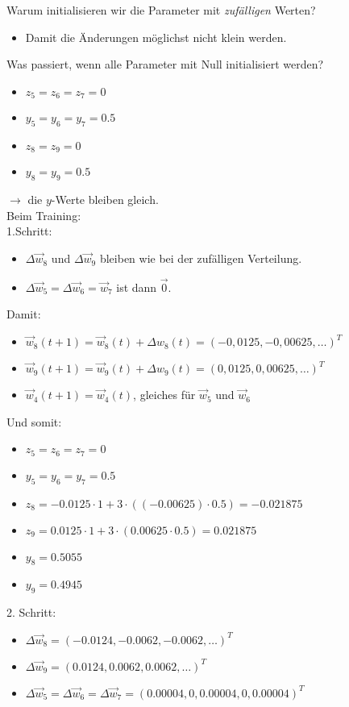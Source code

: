 Warum initialisieren wir die Parameter mit \emph{zufälligen} Werten?
\begin{itemize}
\item Damit die Änderungen möglichst nicht klein werden.
\end{itemize}
Was passiert, wenn alle Parameter mit Null initialisiert werden?
\begin{itemize}
\item $z_5=z_6=z_7=0$
\item $y_5=y_6=y_7=0.5$
\item $z_8=z_9=0$
\item $y_8=y_9=0.5$
\end{itemize}
$\to$ die $y$-Werte bleiben gleich.\\
Beim Training:\\
1.Schritt:
\begin{itemize}
\item $\Delta \vec{w}_8$ und $\Delta \vec{w}_9$ bleiben wie bei der zufälligen Verteilung.
\item $\Delta \vec{w}_5=\Delta \vec{w}_6=\vec{w}_7$ ist dann $\vec{0}$.
\end{itemize}
Damit:
\begin{itemize}
\item $\vec{w}_8(t+1)=\vec{w}_8(t)+\Delta w_8(t) = (-0,0125, -0,00625,\ldots)^T$
\item $\vec{w}_9(t+1)=\vec{w}_9(t)+\Delta w_9(t) = (0,0125, 0,00625,\ldots)^T$
\item $\vec{w}_4(t+1) = \vec{w}_4(t)$, gleiches für $\vec{w}_5$ und $\vec{w}_6$
\end{itemize}
Und somit:
\begin{itemize}
\item $z_5=z_6=z_7= 0$
\item $y_5=y_6=y_7 = 0.5$
\item $z_8=-0.0125\cdot 1 + 3 \cdot ((-0.00625)\cdot  0.5)=-0.021875$
\item $z_9=0.0125\cdot 1 + 3 \cdot (0.00625\cdot  0.5)=0.021875$
\item $y_8=0.5055$
\item $y_9=0.4945$
\end{itemize}
2. Schritt:
\begin{itemize}
\item $\Delta\vec{w}_8=(-0.0124,-0.0062,-0.0062,\ldots)^T$
\item $\Delta\vec{w}_9=(0.0124, 0.0062,0.0062,\ldots)^T$
\item $\Delta \vec{w}_5=\Delta \vec{w}_6 = \Delta\vec{w}_7 = (0.00004, 0, 0.00004, 0, 0.00004)^T$
\end{itemize}
